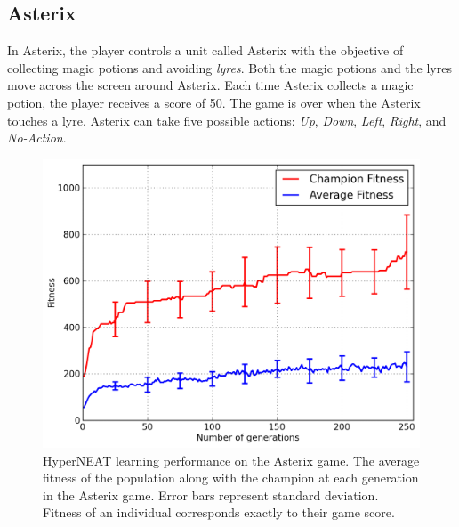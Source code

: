 \documentclass{acm_proc_article-sp}
\begin{document}
\subsection {Asterix}
In Asterix, the player controls a unit called Asterix with the objective of collecting magic potions and avoiding \textit{lyres}. Both the magic potions and the lyres move across the screen around Asterix. Each time Asterix collects a magic potion, the player receives a score of 50. The game is over when the Asterix touches a lyre. Asterix can take five possible actions: \textit{Up}, \textit{Down}, \textit{Left}, \textit{Right}, and \textit{No-Action}.

\begin{figure}[ht]
\begin{center}
\includegraphics[width=\columnwidth]{figures/asterix-results.png}
\end{center}
\caption{HyperNEAT learning performance on the Asterix game. The average fitness of the population along with the champion at each generation in the Asterix game. Error bars represent standard deviation. Fitness of an individual corresponds exactly to their game score.}
\label{fig:asterix-curve}
\end{figure}
\end{document}
